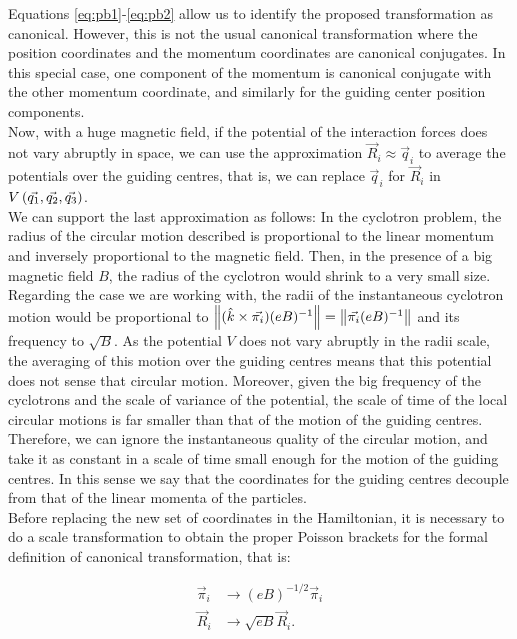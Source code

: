 Equations \eqref{eq:pb1}-\eqref{eq:pb2} allow us to identify the proposed transformation as canonical. However, this is not the usual canonical transformation where the position coordinates and the momentum coordinates are canonical conjugates. In this special case, one component of the momentum is canonical conjugate with the other momentum coordinate, and similarly for the guiding center position components.\\

Now, with a huge magnetic field, if the potential of the interaction forces does not vary abruptly in space, we can use the approximation $\vec{R}_i \approx \vec{q}_i$ to average the potentials over the guiding centres, that is, we can replace $\vec{q}_i$ for $\vec{R}_i$ in  $V \left(  \vec{q_1},\vec{q_2},\vec{q_3}  \right)$.\\

We can support the last approximation as follows: In the cyclotron problem, the radius of the circular motion described is proportional to the linear momentum and inversely proportional to the magnetic field. Then, in the presence of a big magnetic field $B$, the radius of the cyclotron would shrink to a very small size. Regarding the case we are working with, the radii of the instantaneous cyclotron motion would be proportional to $\left\lVert (\hat{k} \times \vec{\pi_i})(eB)^{-1} \right\rVert = \left\lVert \vec{\pi_i}(eB)^{-1} \right\rVert$ and its frequency to $\sqrt{B}$. As the potential $V$ does not vary abruptly in the radii scale, the averaging of this motion over the guiding centres means that this potential does not sense that circular motion. Moreover, given the big frequency of the cyclotrons and the scale of variance of the potential, the scale of time of the local circular motions is far smaller than that of the motion of the guiding centres. Therefore, we can ignore the instantaneous quality of the circular motion, and take it as constant in a scale of time small enough for the motion of the guiding centres. In this sense we say that the coordinates for the guiding centres decouple from that of the linear momenta of the particles.\\

Before replacing the new set of coordinates in the Hamiltonian, it is necessary to do a scale transformation to obtain the proper Poisson brackets for the formal definition of canonical transformation, that is:

\begin{align*}
\vec{\pi}_i & \rightarrow (eB)^{-1/2} \vec{ \pi}_i\\
\vec{R}_i & \rightarrow \sqrt{eB} \vec{R}_i.
\end{align*}

